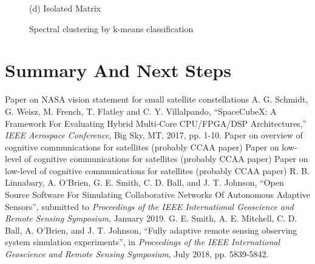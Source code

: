 \documentclass[conference]{IEEEtran}
\begin{document}
\begin{figure}[t!]
\begin{minipage}[b]{0.32\linewidth}
\begin{center}
      {\footnotesize(d) Isolated Matrix}
    \end{center}
  \end{minipage}
  \caption{Spectral clustering by k-means classification}
  \label{fig:clusters}
\end{figure}


\section{Summary And Next Steps}
\label{sec:summary}


\begin{thebibliography}{9}
{\small
{} Paper on NASA vision statement for small satellite constellations
 A. G. Schmidt, G. Weisz, M. French, T. Flatley and
C. Y. Villalpando, ``SpaceCubeX: A Framework For Evaluating Hybrid Multi-Core
CPU/FPGA/DSP Architectures,'' \textit{IEEE Aerospace Conference}, Big Sky,
MT, 2017, pp. 1-10.
 Paper on overview of cognitive communications for satellites
  (probably CCAA paper)
 Paper on low-level of cognitive communications for satellites
  (probably CCAA paper)
 Paper on low-level of cognitive communications for satellites
  (probably CCAA paper)
 R. B. Linnabary, A. O'Brien, G. E. Smith, C. D. Ball, and
  J. T. Johnson, ``Open Source Software For Simulating Collaborative Networks Of
  Autonomous Adaptive Sensors'', submitted to {\it Proceedings of the IEEE
    International Geoscience and Remote Sensing Symposium}, January 2019.
 G. E. Smith, A. E. Mitchell, C. D. Ball, A. O'Brien, and
  J. T. Johnson, ``Fully adaptive remote sensing observing system simulation
  experiments'', in {\it Proceedings of the IEEE International Geoscience and
    Remote Sensing Symposium}, July 2018, pp. 5839-5842.
}
\end{thebibliography}
\end{document}

